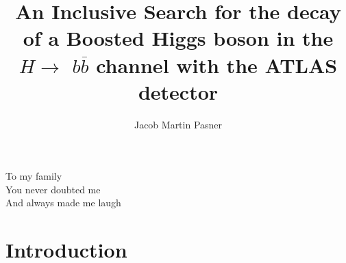 \documentclass[11pt]{ucthesis}
\begin{document}

\title{An Inclusive Search for the decay of a Boosted Higgs boson in the $H
\rightarrow$ \MakeLowercase{$b\overline{b}$} channel with the ATLAS detector}
\author{Jacob Martin Pasner}
\deanlinethree{}

\begin{frontmatter}

\maketitle
\copyrightpage

\tableofcontents
\listoffigures
\listoftables

\begin{abstract}

\label{sec:abstract}


\end{abstract}

\begin{dedication}
\null\vfil
{\large
\begin{center}
To my family\\\vspace{12pt}
You never doubted me\\\vspace{12pt}
And always made me laugh
\end{center}}
\vfil\null
\end{dedication}


\begin{acknowledgements}

\label{sec:acknowledgements}


\end{acknowledgements}

\end{frontmatter}


\chapter{Introduction}

\label{sec:introduction}

\end{document}
